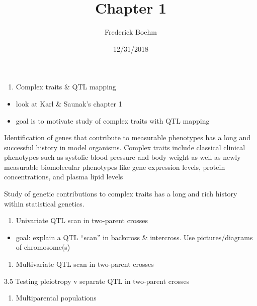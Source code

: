 \documentclass[]{article}
\title{Chapter 1}
\author{Frederick Boehm}
\date{12/31/2018}
\providecommand{\tightlist}{%
  \setlength{\itemsep}{0pt}\setlength{\parskip}{0pt}}
\begin{document}
\maketitle

\begin{enumerate}
\def\labelenumi{\arabic{enumi}.}
\tightlist
\item
  Complex traits \& QTL mapping
\end{enumerate}

\begin{itemize}
\tightlist
\item
  look at Karl \& Saunak's chapter 1
\item
  goal is to motivate study of complex traits with QTL mapping
\end{itemize}

Identification of genes that contribute to measurable phenotypes has a
long and successful history in model organisms. Complex traits include
classical clinical phenotypes such as systolic blood pressure and body
weight as well as newly measurable biomolecular phenotypes like gene
expression levels, protein concentrations, and plasma lipid levels

Study of genetic contributions to complex traits has a long and rich
history within statistical genetics.

\begin{enumerate}
\def\labelenumi{\arabic{enumi}.}
\setcounter{enumi}{1}
\tightlist
\item
  Univariate QTL scan in two-parent crosses
\end{enumerate}

\begin{itemize}
\tightlist
\item
  goal: explain a QTL ``scan'' in backcross \& intercross. Use
  pictures/diagrams of chromosome(s)
\end{itemize}

\begin{enumerate}
\def\labelenumi{\arabic{enumi}.}
\setcounter{enumi}{2}
\tightlist
\item
  Multivariate QTL scan in two-parent crosses
\end{enumerate}

3.5 Testing pleiotropy v separate QTL in two-parent crosses

\begin{enumerate}
\def\labelenumi{\arabic{enumi}.}
\setcounter{enumi}{3}
\tightlist
\item
  Multiparental populations
\end{enumerate}
\end{document}
